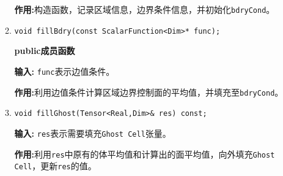 \documentclass[UTF8]{ctexart}
\theoremstyle{plain}
\theoremstyle{definition}
\theoremstyle{remark}
\begin{document}
\begin{itemize}
\begin{enumerate}
        \textbf{作用:}构造函数，记录区域信息，边界条件信息，并初始化\texttt{bdryCond}。

        \item \texttt{void fillBdry(const ScalarFunction<Dim>* func);}
        
        \textbf{public成员函数}

        \textbf{输入:} \texttt{func}表示边值条件。

        \textbf{作用:}利用边值条件计算区域边界控制面的平均值，并填充至\texttt{bdryCond}。

        \item \texttt{void fillGhost(Tensor<Real,Dim>\& res) const;}
        
        \textbf{输入:} \texttt{res}表示需要填充\texttt{Ghost Cell}张量。

        \textbf{作用:}利用\texttt{res}中原有的体平均值和计算出的面平均值，向外填充\texttt{Ghost Cell}，更新\texttt{res}的值。
    \end{enumerate}
\end{itemize}
\end{document}
